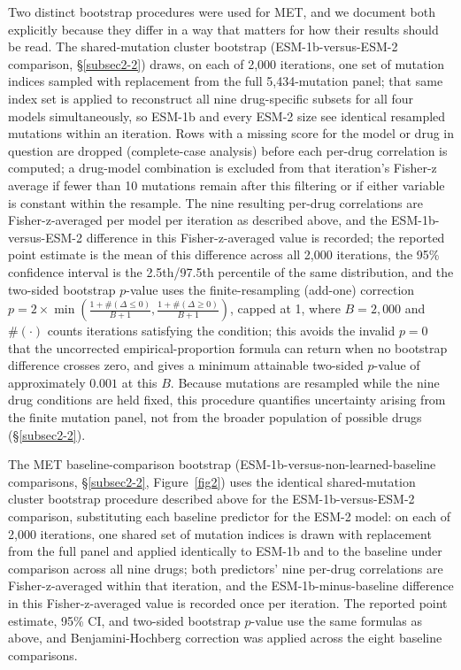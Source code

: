 \documentclass[pdflatex,sn-mathphys-num]{sn-jnl}%
\theoremstyle{thmstyleone}%
\theoremstyle{thmstyletwo}%
\theoremstyle{thmstylethree}%
\begin{document}
Two distinct bootstrap procedures were used for MET, and we document both explicitly because they differ in a way that matters for how their results should be read. The shared-mutation cluster bootstrap (ESM-1b-versus-ESM-2 comparison, \S\ref{subsec2-2}) draws, on each of 2{,}000 iterations, one set of mutation indices sampled with replacement from the full 5{,}434-mutation panel; that same index set is applied to reconstruct all nine drug-specific subsets for all four models simultaneously, so ESM-1b and every ESM-2 size see identical resampled mutations within an iteration. Rows with a missing score for the model or drug in question are dropped (complete-case analysis) before each per-drug correlation is computed; a drug-model combination is excluded from that iteration's Fisher-z average if fewer than 10 mutations remain after this filtering or if either variable is constant within the resample. The nine resulting per-drug correlations are Fisher-z-averaged per model per iteration as described above, and the ESM-1b-versus-ESM-2 difference in this Fisher-z-averaged value is recorded; the reported point estimate is the mean of this difference across all 2{,}000 iterations, the 95\% confidence interval is the 2.5th/97.5th percentile of the same distribution, and the two-sided bootstrap $p$-value uses the finite-resampling (add-one) correction $p = 2 \times \min\!\left(\frac{1 + \#(\Delta \leq 0)}{B+1}, \frac{1 + \#(\Delta \geq 0)}{B+1}\right)$, capped at 1, where $B=2{,}000$ and $\#(\cdot)$ counts iterations satisfying the condition; this avoids the invalid $p=0$ that the uncorrected empirical-proportion formula can return when no bootstrap difference crosses zero, and gives a minimum attainable two-sided $p$-value of approximately $0.001$ at this $B$. Because mutations are resampled while the nine drug conditions are held fixed, this procedure quantifies uncertainty arising from the finite mutation panel, not from the broader population of possible drugs (\S\ref{subsec2-2}).

The MET baseline-comparison bootstrap (ESM-1b-versus-non-learned-baseline comparisons, \S\ref{subsec2-2}, Figure~\ref{fig2}) uses the identical shared-mutation cluster bootstrap procedure described above for the ESM-1b-versus-ESM-2 comparison, substituting each baseline predictor for the ESM-2 model: on each of 2{,}000 iterations, one shared set of mutation indices is drawn with replacement from the full panel and applied identically to ESM-1b and to the baseline under comparison across all nine drugs; both predictors' nine per-drug correlations are Fisher-z-averaged within that iteration, and the ESM-1b-minus-baseline difference in this Fisher-z-averaged value is recorded once per iteration. The reported point estimate, 95\% CI, and two-sided bootstrap $p$-value use the same formulas as above, and Benjamini-Hochberg correction \citep{BenjaminiHochberg1995} was applied across the eight baseline comparisons.
\end{document}
